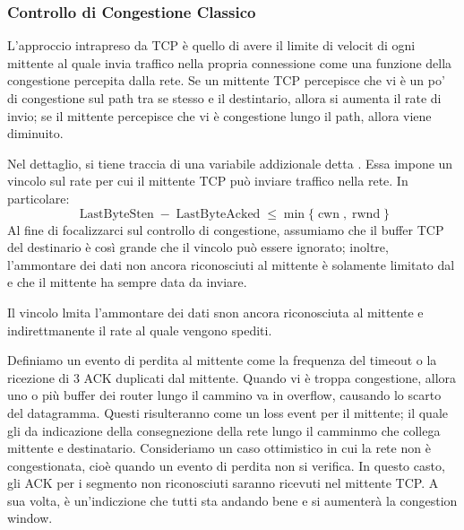 \documentclass{book}
\newcommand{\tmop}[1]{\ensuremath{\operatorname{#1}}}
\newcommand{\tmtextbf}[1]{\text{{\bfseries{#1}}}}
\newcommand{\tmtextit}[1]{\text{{\itshape{#1}}}}
\begin{document}
\subsubsection{Controllo di Congestione Classico}

L'approccio intrapreso da TCP {\`e} quello di avere il limite di velocit di
ogni mittente al quale invia traffico nella propria connessione come una
funzione della congestione percepita dalla rete. Se un mittente TCP percepisce
che vi {\`e} un po' di congestione sul path tra se stesso e il destintario,
allora si aumenta il rate di invio; se il mittente percepisce che vi {\`e}
congestione lungo il path, allora viene diminuito.

Nel dettaglio, si tiene traccia di una variabile addizionale detta
\tmtextbf{congestion window} \tmtextit{cwnd}. Essa impone un vincolo sul rate
per cui il mittente TCP pu{\`o} inviare traffico nella rete. In particolare:
\[ \tmop{LastByteSten} - \tmop{LastByteAcked} \leqslant \min \{ \tmop{cwn},
   \tmop{rwnd} \} \]
Al fine di focalizzarci sul controllo di congestione, assumiamo che il buffer
TCP del destinario {\`e} cos{\`i} grande che il vincolo pu{\`o} essere
ignorato; inoltre, l'ammontare dei dati non ancora riconosciuti al mittente
{\`e} solamente limitato dal \tmtextit{cwnd} e che il mittente ha sempre data
da inviare.

Il vincolo lmita l'ammontare dei dati snon ancora riconosciuta al mittente e
indirettmanente il rate al quale vengono spediti.

Definiamo un evento di perdita al mittente come la frequenza del timeout o la
ricezione di 3 ACK duplicati dal mittente. Quando vi {\`e} troppa congestione,
allora uno o pi{\`u} buffer dei router lungo il cammino va in overflow,
causando lo scarto del datagramma. Questi risulteranno come un loss event per
il mittente; il quale gli da indicazione della consegnezione della rete lungo
il camminmo che collega mittente e destinatario. Consideriamo un caso
ottimistico in cui la rete non {\`e} congestionata, cio{\`e} quando un evento
di perdita non si verifica. In questo casto, gli ACK per i segmento non
riconosciuti saranno ricevuti nel mittente TCP. A sua volta, {\`e}
un'indiczione che tutti sta andando bene e si aumenter{\`a} la congestion
window.
\end{document}
